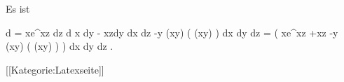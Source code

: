 Es ist

\mavergleichskettealign
{\vergleichskettealign
{ d \omega
}
{ =} { xe^{xz} dz \wedge d x \wedge dy - xzdy \wedge dx \wedge dz  -y \sin (xy)  \cos ( \cos (xy) )  dx \wedge dy \wedge dz
}
{ =} {  \left(  xe^{xz} +xz  -y \sin (xy)  \cos ( \cos (xy) )  \right) dx \wedge dy \wedge dz
}
{ } {
}
{ } {}
}
{}
{}{.}

 [[Kategorie:Latexseite]]
